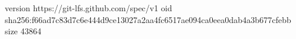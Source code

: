 version https://git-lfs.github.com/spec/v1
oid sha256:f66ad7c83d7c6e444d9ce13027a2aa4fc6517ae094ca0eea0dab4a3b677cfebb
size 43864

